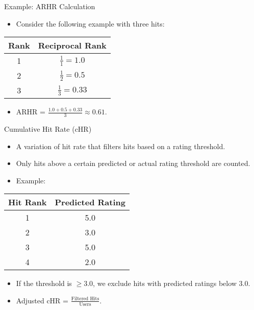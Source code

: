 \documentclass{beamer}
\begin{document}
\begin{frame}{Example: ARHR Calculation}
\begin{itemize}
    \item Consider the following example with three hits:
\end{itemize}

\begin{center}
\begin{tabular}{|c|c|}
\hline
\textbf{Rank} & \textbf{Reciprocal Rank} \\ \hline
1 & \( \frac{1}{1} = 1.0 \) \\ \hline
2 & \( \frac{1}{2} = 0.5 \) \\ \hline
3 & \( \frac{1}{3} = 0.33 \) \\ \hline
\end{tabular}
\end{center}

\begin{itemize}
    \item ARHR = \( \frac{1.0 + 0.5 + 0.33}{3} \approx 0.61 \).
\end{itemize}
\end{frame}

\begin{frame}{Cumulative Hit Rate (cHR)}
\begin{itemize}
    \item A variation of hit rate that filters hits based on a rating threshold.
    \item Only hits above a certain predicted or actual rating threshold are counted.
    \item Example:
\end{itemize}

\begin{center}
\begin{tabular}{|c|c|}
\hline
\textbf{Hit Rank} & \textbf{Predicted Rating} \\ \hline
1 & 5.0 \\ \hline
2 & 3.0 \\ \hline
3 & 5.0 \\ \hline
4 & 2.0 \\ \hline
\end{tabular}
\end{center}

\begin{itemize}
    \item If the threshold is \( \geq 3.0 \), we exclude hits with predicted ratings below 3.0.
    \item Adjusted cHR = \( \frac{\text{Filtered Hits}}{\text{Users}} \).
\end{itemize}
\end{frame}
\end{document}
